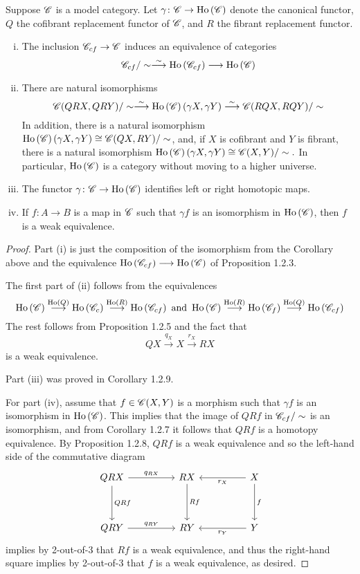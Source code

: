 \documentclass[10pt]{amsart}
\begin{document}
\begin{thm}
  Suppose $\mathscr{C}$ is a model category.
  Let $\gamma \colon \mathscr{C} \to \operatorname{Ho}\left(\mathscr{C}\right)$ denote the canonical functor, $Q$ the cofibrant replacement functor of $\mathscr{C}$, and $R$ the fibrant replacement functor.
  \begin{enumerate}[(i)]
  \item
    The inclusion $\mathscr{C}_{cf} \to \mathscr{C}$ induces an equivalence of categories
    $$\mathscr{C}_{cf}/\sim \overset{\sim}\longrightarrow \operatorname{Ho}\left(\mathscr{C}_{cf}\right) \longrightarrow \operatorname{Ho}\left(\mathscr{C}\right)$$
  \item
    There are natural isomorphisms
    $$\mathscr{C}(QRX, QRY)/\sim \overset{\sim}\longrightarrow \operatorname{Ho}\left(\mathscr{C}\right)\left(\gamma X, \gamma Y\right) \overset{\sim}\longrightarrow \mathscr{C}(RQX, RQY)/\sim$$
    In addition, there is a natural isomorphism $\operatorname{Ho}\left(\mathscr{C}\right)\left(\gamma X, \gamma Y\right) \cong \mathscr{C}(QX, RY)/\sim$, and, if $X$ is cofibrant and $Y$ is fibrant, there is a natural isomorphism $\operatorname{Ho}\left(\mathscr{C}\right)\left(\gamma X, \gamma Y\right) \cong \mathscr{C}(X,Y)/\sim.$
    In particular, $\operatorname{Ho}\left(\mathscr{C}\right)$ is a category without moving to a higher universe.
  \item
    The functor $\gamma \colon \mathscr{C} \to \operatorname{Ho}\left(\mathscr{C}\right)$ identifies left or right homotopic maps.
  \item
    If $f \colon A \longrightarrow B$ is a map in $\mathscr{C}$ such that $\gamma f$ is an isomorphism in $\operatorname{Ho}\left(\mathscr{C}\right)$, then $f$ is a weak equivalence.
  \end{enumerate}

  \begin{proof}
    Part (i) is just the composition of the isomorphism from the Corollary above and the equivalence $\operatorname{Ho}\left(\mathscr{C}_{cf}\right) \longrightarrow \operatorname{Ho}\left(\mathscr{C}\right)$ of Proposition 1.2.3.
    
    The first part of (ii) follows from the equivalences
    $$\Ho{\C} \overset{\Ho{Q}}\longrightarrow \Ho{\C_c} \overset{\Ho{R}}\longrightarrow \Ho{\C_{cf}}\ \text{and}\ 
    \Ho{\C} \overset{\Ho{R}}\longrightarrow \Ho{\C_f} \overset{\Ho{Q}}\longrightarrow \Ho{\C_{cf}}$$
    The rest follows from Proposition 1.2.5 and the fact that
    $$QX \overset{q_X}\longrightarrow X \overset{r_X}\longrightarrow RX$$
    is a weak equivalence.

    Part (iii) was proved in Corollary 1.2.9.
    
    For part (iv), assume that $f \in \mathscr{C}(X,Y)$ is a morphism such that $\gamma f$ is an isomorphism in $\operatorname{Ho}\left(\mathscr{C}\right)$.
    This implies that the image of $QRf$ in $\mathscr{C}_{cf}/\sim$ is an isomorphism, and from Corollary 1.2.7 it follows that $QRf$ is a homotopy equivalence.
    By Proposition 1.2.8, $QRf$ is a weak equivalence and so the left-hand side of the commutative diagram
    $$\begin{tikzcd}
      QRX \arrow{rr}{q_{RX}}\arrow{dd}{QRf} && RX \arrow{dd}{Rf} && X \arrow{ll}{r_X}\arrow{dd}{f}\\
      \\
      QRY\arrow{rr}{q_{RY}} && RY && Y \arrow{ll}{r_Y}
    \end{tikzcd}$$
    implies by 2-out-of-3 that $Rf$ is a weak equivalence, and thus the right-hand square implies by 2-out-of-3 that $f$ is a weak equivalence, as desired.
  \end{proof}
\end{thm}
\end{document}
